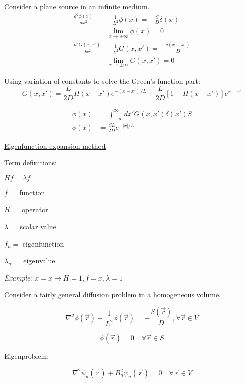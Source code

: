 \documentclass[12pt]{article}
\newcommand{\rvec}{\ensuremath{\vec{r}}}
\newcommand{\vecr}{\ensuremath{\vec{r}}}
\begin{document}
Consider a plane source in an infinite medium.
%
\begin{align*}
\frac{d^2\phi(x)}{dx^2} &- \frac{1}{L^2}\phi(x) = -\frac{S}{D}\delta(x)\\
&\lim\limits_{x\to\pm\infty}\phi(x) = 0\\
\frac{d^2 G(x,x')}{dx^2} &- \frac{1}{L^2}G(x,x') = -\frac{\delta(x-x')}{D}\\
&\lim\limits_{x\to\pm\infty}G(x,x') = 0
\end{align*}

Using variation of constants to solve the Green's function part:
%
\begin{equation*}
G(x,x') = \frac{L}{2D}H(x-x')e^{-(x-x')/L} + \frac{L}{2D}[1-H(x-x')]e^{x-x'}
\end{equation*}

\begin{align*}
\phi(x) &= \int_{-\infty}^{\infty}dx'G(x,x')\delta(x')S\\
\phi(x) &= \frac{SL}{2D}e^{-|x|/L}
\end{align*}

\underline{Eigenfunction expansion method}

Term definitions:

$Hf = \lambda f$

$f =$ function

$H =$ operator

$\lambda =$ scalar value

$f_n =$ eigenfunction

$\lambda_n =$ eigenvalue


\emph{Example}: $x = x \rightarrow H = 1, f = x, \lambda = 1$ 

Consider a fairly general diffusion problem in a homogeneous volume.

\begin{equation*}
\nabla^2\phi(\vecr) - \frac{1}{L^2}\phi(\vecr) = -\frac{S(\rvec)}{D}, \forall \rvec \in V
\end{equation*}

\begin{equation*}
\phi(\rvec) = 0 \quad\forall \rvec \in S
\end{equation*}

Eigenproblem:

\begin{equation*}
\nabla^2\psi_n(\rvec) + B_n^2\psi_n(\rvec) = 0 \quad\forall \rvec \in V
\end{equation*}
\end{document}
